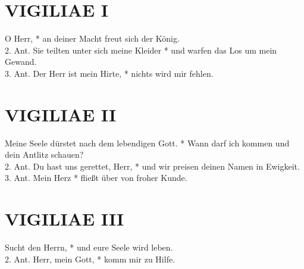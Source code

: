 \section{VIGILIAE I}

\begin{sloppypar}

{ O Herr, * an deiner Macht freut sich der König. \\
2. Ant. Sie teilten unter sich meine Kleider * und warfen das Los um mein Gewand. \\
3. Ant. Der Herr ist mein Hirte, * nichts wird mir fehlen. \\}
\end{sloppypar}

\medskip

\begin{flushleft}


\end{flushleft}

\newpage

\section{VIGILIAE II}

\begin{sloppypar}
{ Meine Seele dürstet nach dem lebendigen Gott. * Wann darf ich kommen und dein Antlitz schau\-en? \\
2. Ant. Du hast uns gerettet, Herr, * und wir preisen deinen Namen in Ewigkeit. \\
3. Ant. Mein Herz * fließt über von froher Kunde. }
\end{sloppypar}

\begin{flushleft}


\end{flushleft}

\section{VIGILIAE III}

\begin{sloppypar}
{ Sucht den Herrn, * und eure Seele wird leben.
       \\         
2. Ant. Herr, mein Gott, * komm mir zu Hilfe. }
\end{sloppypar}

